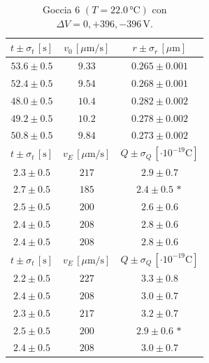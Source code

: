 \documentclass[]{article}
\begin{document}
    \begin{table}[H]
        \centering
        \begin{tabular}{||c|c|c||}
            \hline
            $t \pm \sigma_t \, \left[\text{s}\right]$ & $v_0 \, \left[\mu\text{m/s}\right]$ & $r \pm \sigma_r \, \left[\mu\text{m}\right]$ \\\hline
            \hline
            $53.6 \pm 0.5$ & $9.33$ & $0.265 \pm 0.001$ \\\hline
            $52.4 \pm 0.5$ & $9.54$ & $0.268 \pm 0.001$ \\\hline
            $48.0 \pm 0.5$ & $10.4$ & $0.282 \pm 0.002$ \\\hline
            $49.2 \pm 0.5$ & $10.2$ & $0.278 \pm 0.002$ \\\hline
            $50.8 \pm 0.5$ & $9.84$ & $0.273 \pm 0.002$ \\\hline
            \hline
            $t \pm \sigma_t \, \left[\text{s}\right]$ & $v_E \, \left[\mu\text{m/s}\right]$ & $Q \pm \sigma_Q \, \left[\cdot 10^{-19} \text{C}\right]$ \\\hline
            \hline
            $2.3 \pm 0.5$ & $217$ & $2.9 \pm 0.7$ \\\hline
            $2.7 \pm 0.5$ & $185$ & $2.4 \pm 0.5\,\ast$ \\\hline
            $2.5 \pm 0.5$ & $200$ & $2.6 \pm 0.6$ \\\hline
            $2.4 \pm 0.5$ & $208$ & $2.8 \pm 0.6$ \\\hline
            $2.4 \pm 0.5$ & $208$ & $2.8 \pm 0.6$ \\\hline
            \hline
            $t \pm \sigma_t \, \left[\text{s}\right]$ & $v_E \, \left[\mu\text{m/s}\right]$ & $Q \pm \sigma_Q \, \left[\cdot 10^{-19} \text{C}\right]$ \\\hline
            \hline
            $2.2 \pm 0.5$ & $227$ & $3.3 \pm 0.8$ \\\hline
            $2.4 \pm 0.5$ & $208$ & $3.0 \pm 0.7$ \\\hline
            $2.3 \pm 0.5$ & $217$ & $3.2 \pm 0.7$ \\\hline
            $2.5 \pm 0.5$ & $200$ & $2.9 \pm 0.6\,\ast$ \\\hline
            $2.4 \pm 0.5$ & $208$ & $3.0 \pm 0.7$ \\\hline
        \end{tabular}
        \caption{Goccia 6 $\left(T = 22.0\, \text{°C}\right)$ con $\Delta V = 0,+396,-396 \,\text{V}$.}
        \label{goccia-6}
    \end{table}
\end{document}
